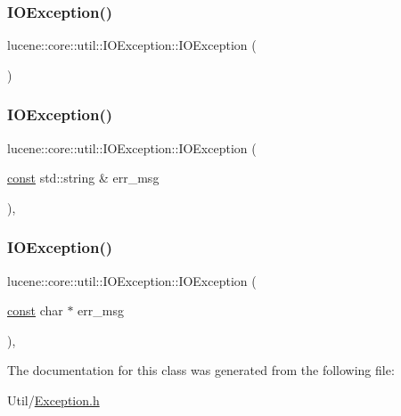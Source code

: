 \subsubsection{\texorpdfstring{I\+O\+Exception()}{IOException()}\hspace{0.1cm}{\footnotesize\ttfamily [1/3]}}
{\footnotesize\ttfamily lucene\+::core\+::util\+::\+I\+O\+Exception\+::\+I\+O\+Exception (\begin{DoxyParamCaption}{ }\end{DoxyParamCaption})\hspace{0.3cm}{\ttfamily [inline]}}

\mbox{\label{classlucene_1_1core_1_1util_1_1IOException_a22be77a2001ab70995002dd3def56d62}} 
\subsubsection{\texorpdfstring{I\+O\+Exception()}{IOException()}\hspace{0.1cm}{\footnotesize\ttfamily [2/3]}}
{\footnotesize\ttfamily lucene\+::core\+::util\+::\+I\+O\+Exception\+::\+I\+O\+Exception (\begin{DoxyParamCaption}\item[{\mbox{\hyperlink{ZlibCrc32_8h_a2c212835823e3c54a8ab6d95c652660e}{const}} std\+::string \&}]{err\+\_\+msg }\end{DoxyParamCaption})\hspace{0.3cm}{\ttfamily [inline]}, {\ttfamily [explicit]}}

\mbox{\label{classlucene_1_1core_1_1util_1_1IOException_ace40620ad92b84c2bbe0fe46b36ff507}} 
\subsubsection{\texorpdfstring{I\+O\+Exception()}{IOException()}\hspace{0.1cm}{\footnotesize\ttfamily [3/3]}}
{\footnotesize\ttfamily lucene\+::core\+::util\+::\+I\+O\+Exception\+::\+I\+O\+Exception (\begin{DoxyParamCaption}\item[{\mbox{\hyperlink{ZlibCrc32_8h_a2c212835823e3c54a8ab6d95c652660e}{const}} char $\ast$}]{err\+\_\+msg }\end{DoxyParamCaption})\hspace{0.3cm}{\ttfamily [inline]}, {\ttfamily [explicit]}}



The documentation for this class was generated from the following file\+:\begin{DoxyCompactItemize}
\item 
Util/\mbox{\hyperlink{Util_2Exception_8h}{Exception.\+h}}\end{DoxyCompactItemize}
